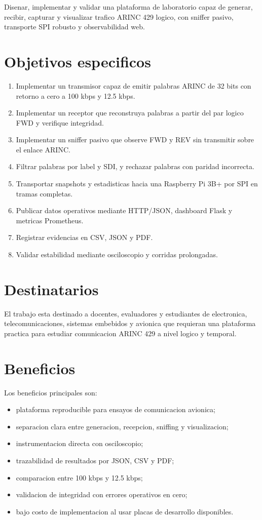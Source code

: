 \documentclass[12pt,a4paper,oneside]{report}
\begin{document}
Disenar, implementar y validar una plataforma de laboratorio capaz de generar,
recibir, capturar y visualizar trafico ARINC 429 logico, con sniffer pasivo,
transporte SPI robusto y observabilidad web.

\section{Objetivos especificos}

\begin{enumerate}
  \item Implementar un transmisor capaz de emitir palabras ARINC de 32 bits con
  retorno a cero a 100 kbps y 12.5 kbps.
  \item Implementar un receptor que reconstruya palabras a partir del par
  logico FWD y verifique integridad.
  \item Implementar un sniffer pasivo que observe FWD y REV sin transmitir
  sobre el enlace ARINC.
  \item Filtrar palabras por label y SDI, y rechazar palabras con paridad
  incorrecta.
  \item Transportar snapshots y estadisticas hacia una Raspberry Pi 3B+ por
  SPI en tramas completas.
  \item Publicar datos operativos mediante HTTP/JSON, dashboard Flask y
  metricas Prometheus.
  \item Registrar evidencias en CSV, JSON y PDF.
  \item Validar estabilidad mediante osciloscopio y corridas prolongadas.
\end{enumerate}

\section{Destinatarios}

El trabajo esta destinado a docentes, evaluadores y estudiantes de electronica,
telecomunicaciones, sistemas embebidos y avionica que requieran una plataforma
practica para estudiar comunicacion ARINC 429 a nivel logico y temporal.

\section{Beneficios}

Los beneficios principales son:

\begin{itemize}
  \item plataforma reproducible para ensayos de comunicacion avionica;
  \item separacion clara entre generacion, recepcion, sniffing y visualizacion;
  \item instrumentacion directa con osciloscopio;
  \item trazabilidad de resultados por JSON, CSV y PDF;
  \item comparacion entre 100 kbps y 12.5 kbps;
  \item validacion de integridad con errores operativos en cero;
  \item bajo costo de implementacion al usar placas de desarrollo disponibles.
\end{itemize}
\end{document}
